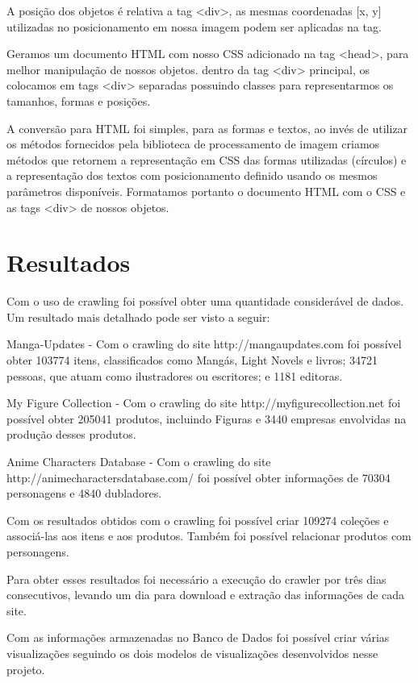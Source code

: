 \documentclass[12pt]{article}
\begin{document}
A posição dos objetos é relativa a tag <div>, as mesmas coordenadas [x, y] utilizadas no posicionamento em nossa imagem podem ser aplicadas na tag.

Geramos um documento HTML com nosso CSS adicionado na tag <head>, para melhor manipulação de nossos objetos. dentro da tag <div> principal, os colocamos em tags <div> separadas possuindo classes para representarmos os tamanhos, formas e posições.

A conversão para HTML foi simples, para as formas e textos, ao invés de utilizar os métodos fornecidos pela biblioteca de processamento de imagem criamos métodos que retornem a representação em CSS das formas utilizadas (círculos) e a representação dos textos com posicionamento definido usando os mesmos parâmetros disponíveis. 
Formatamos portanto o documento HTML com o CSS e as tags <div> de nossos objetos.


\section{Resultados}

Com o uso de crawling foi possível obter uma quantidade considerável de dados. Um resultado mais detalhado pode ser visto a seguir: 

Manga-Updates - Com o crawling do site http://mangaupdates.com foi possível obter 103774 itens, classificados como Mangás, Light Novels e livros; 34721 pessoas, que atuam como ilustradores ou escritores; e 1181 editoras.

My Figure Collection - Com o crawling do site http://myfigurecollection.net foi possível obter 205041 produtos, incluindo Figuras e 3440 empresas envolvidas na produção desses produtos.

Anime Characters Database - Com o crawling do site http://animecharactersdatabase.com/ foi possível obter informações de 70304 personagens e 4840 dubladores.

Com os resultados obtidos com o crawling foi possível criar 109274 coleções e associá-las aos itens e aos produtos. Também foi possível relacionar produtos com personagens.

Para obter esses resultados foi necessário a execução do crawler por três dias consecutivos, levando um dia para download e extração das informações de cada site.  

Com as informações armazenadas no Banco de Dados foi possível criar várias visualizações seguindo os dois modelos de visualizações desenvolvidos nesse projeto.
\end{document}
